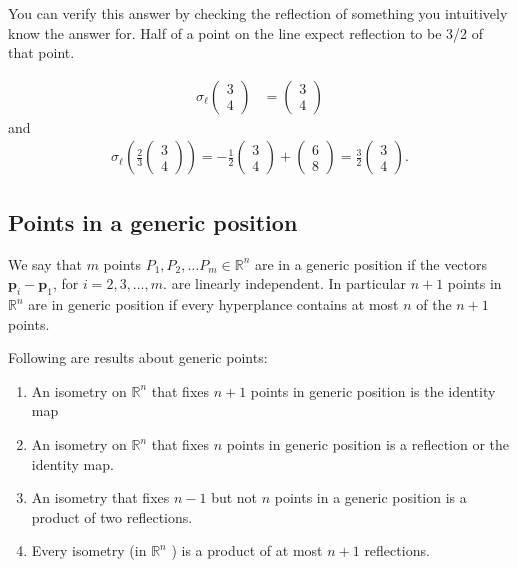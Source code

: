 You can verify this answer by checking the reflection of something you intuitively know the answer for. 
Half of a point on the line expect reflection to be 3/2 of that point.

\begin{align*}
  \sigma_{\ell} \begin{pmatrix} 3 \\ 4 \end{pmatrix} &= \begin{pmatrix} 3 \\ 4 \end{pmatrix}  
\end{align*}
and
\begin{align*}
  \sigma_{\ell} \left( \frac{2}{3} \begin{pmatrix} 3 \\ 4 \end{pmatrix}  \right) = -\frac{1}{2} \begin{pmatrix} 3 \\ 4 \end{pmatrix} + \begin{pmatrix} 6 \\ 8 \end{pmatrix} = \frac{3}{2} \begin{pmatrix} 3 \\ 4 \end{pmatrix}
.\end{align*}

\subsection{Points in a generic position}

\begin{definition}
 We say that \( m \) points \( P_1, P_2, \ldots P_m \in \mathbb{R}^{n} \)  are
 in a generic position if the vectors \( \mathbf{p}_i - \mathbf{p}_1 \),
  for \( i =2, 3, \ldots , m \). are linearly independent.
  In particular \( n + 1 \) points in \( \mathbb{R}^{n} \) are in
  generic position if every hyperplance contains at most \( n \)
  of the \( n + 1 \) points.
\end{definition}

\begin{theorem}
  Following are results about generic points:
  \begin{enumerate}
    \item An isometry on \( \mathbb{R}^{n} \) that fixes \( n + 1 \) points in generic position is
  the identity map
  \item An isometry on \( \mathbb{R}^{n} \) that fixes \( n \) points in generic position
  is a reflection or the identity map.
\item An isometry that fixes \( n - 1 \) but not \( n \) points in a generic position
  is a product of two reflections.
   \item Every isometry (in \( \mathbb{R}^{n} \) ) is a product of at most \( n + 1 \) reflections.
  \end{enumerate}
\end{theorem}

